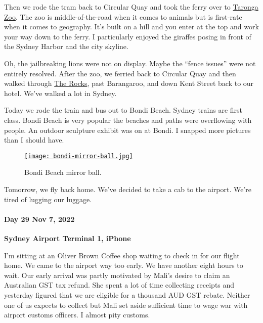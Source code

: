 Then we rode the tram back to Circular Quay and took the ferry over to
\href{https://taronga.org.au/sydney-zoo}{Taronga Zoo}. The zoo is
middle-of-the-road when it comes to animals but is first-rate when it
comes to geography. It's built on a hill and you enter at the top and
work your way down to the ferry. I particularly enjoyed the giraffes
posing in front of the Sydney Harbor and the city skyline.

Oh, the jailbreaking lions were not on display. Maybe the ``fence
issues'' were not entirely resolved. After the zoo, we ferried back to
Circular Quay and then walked through
\href{https://www.sydney.com/destinations/sydney/sydney-city/the-rocks}{The
Rocks}, past Barangaroo, and down Kent Street back to our hotel. We've
walked a lot in Sydney.

Today we rode the train and bus out to Bondi Beach. Sydney trains are
first class. Bondi Beach is very popular the beaches and paths were
overflowing with people. An outdoor sculpture exhibit was on at Bondi. I
snapped more pictures than I should have.

\captionsetup[figure]{labelformat=empty}
\begin{figure}[htbp]
\centering
\href{https://conceptcontrol.smugmug.com/Trips/Overseas/Australia-New-Zealand-2022/i-DtsNvCQ/A}{\texttt{[image: bondi-mirror-ball.jpg]}}
\caption{Bondi Beach mirror ball.}
\label{fig:7627x3}
\end{figure}

Tomorrow, we fly back home. We've decided to take a cab to the airport.
We're tired of lugging our luggage.

\hypertarget{day-29-nov-7-2022-sydney-airport-terminal-1-iphone}{%
\paragraph{\texorpdfstring{\textbf{Day 29 Nov 7, 2022}}{Day 29 Nov 7, 2022}}\label{day-29-nov-7-2022-sydney-airport-terminal-1-iphone}}

\textbf{Sydney Airport Terminal 1, iPhone}

I'm sitting at an Oliver Brown Coffee shop waiting to check in for our
flight home. We came to the airport way too early. We have another eight
hours to wait. Our early arrival was partly motivated by Mali's desire
to claim an Australian GST tax refund. She spent a lot of time
collecting receipts and yesterday figured that we are eligible for a
thousand AUD GST rebate. Neither one of us expects to collect but Mali
set aside sufficient time to wage war with airport customs officers. I
almost pity customs.


